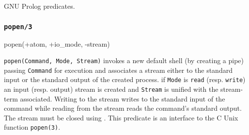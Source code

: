 GNU Prolog predicates.

\subsubsection{\texttt{popen/3}}
\label{popen/3}

\begin{TemplatesOneCol}
popen(+atom, +io\_mode, -stream)

\end{TemplatesOneCol}

\Description

\texttt{popen(Command, Mode, Stream)} invokes a new default shell (by
creating a pipe) passing \texttt{Command} for execution and associates a
stream either to the standard input or the standard output of the created
process. if \texttt{Mode} is \texttt{read} (resp. \texttt{write}) an input
(resp. output) stream is created and \texttt{Stream} is unified with the
stream-term associated. Writing to the stream writes to the standard input
of the command while reading from the stream reads the command's standard
output. The stream must be closed using  .
This predicate is an interface to the C Unix function \texttt{popen(3)}.

\begin{PlErrors}








\end{PlErrors}

\Portability

